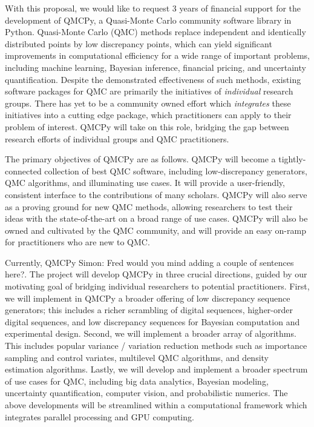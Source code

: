 \documentclass[11pt]{article}%
\newcommand{\SMNote}[1]{{\color{blue}Simon: #1}}
\begin{document}

\noindent With this proposal, we would like to request 3 years of financial support for the development of QMCPy, a Quasi-Monte Carlo community software library in Python. Quasi-Monte Carlo (QMC) methods replace independent and identically distributed points by low discrepancy points, which can yield significant improvements in computational efficiency for a wide range of important problems, including machine learning, Bayesian inference, financial pricing, and uncertainty quantification. Despite the demonstrated effectiveness of such methods, existing software packages for QMC are primarily the initiatives of \textit{individual} research groups. There has yet to be a community owned effort which \textit{integrates} these initiatives into a cutting edge package, which practitioners can apply to their problem of interest. QMCPy will take on this role, bridging the gap between research efforts of individual groups and QMC practitioners.

The primary objectives of QMCPy are as follows. QMCPy will become a tightly-connected collection of best QMC software, including low-discrepancy generators, QMC algorithms, and illuminating use cases. It will provide a user-friendly, consistent interface to the contributions of many scholars. QMCPy will also serve as a proving ground for new QMC methods, allowing researchers to test their ideas with the state-of-the-art on a broad range of use cases. QMCPy will also be owned and cultivated by the QMC community, and will provide an easy on-ramp for practitioners who are new to QMC.

Currently, QMCPy \SMNote{Fred would you mind adding a couple of sentences here?}. The project will develop QMCPy in three crucial directions, guided by our motivating goal of bridging individual researchers to potential practitioners. First, we will implement in QMCPy a broader offering of low discrepancy sequence generators; this includes a richer scrambling of digital sequences, higher-order digital sequences, and low discrepancy sequences for Bayesian computation and experimental design. Second, we will implement a broader array of algorithms. This includes popular variance / variation reduction methods such as importance sampling and control variates, multilevel QMC algorithms, and density estimation algorithms. Lastly, we will develop and implement a broader spectrum of use cases for QMC, including big data analytics, Bayesian modeling, uncertainty quantification, computer vision, and probabilistic numerics. The above developments will be streamlined within a computational framework which integrates parallel processing and GPU computing.
\end{document}
